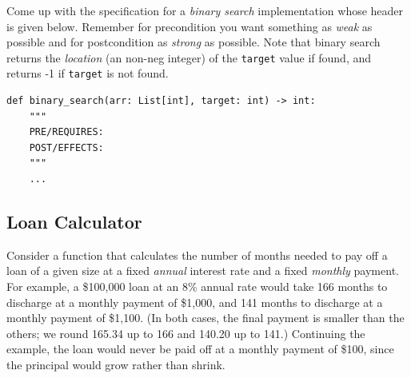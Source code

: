 \documentclass[oneside,11pt,dvipsnames]{book}
\newcommand{\code}[1]{\texttt{#1}}
\begin{document}
Come up with the specification for a \emph{binary search} implementation whose header is given below. Remember for precondition you want something as \emph{weak} as possible and for postcondition as \emph{strong} as possible. Note that binary search returns the \emph{location} (an non-neg integer) of the \code{target} value if found, and returns -1 if \code{target} is not found. 

\begin{lstlisting}
def binary_search(arr: List[int], target: int) -> int:
    """
    PRE/REQUIRES: 
    POST/EFFECTS: 
    """
    ... 
\end{lstlisting}


\subsection{Loan Calculator}\label{exercise:loan-calculator}    

Consider a function that calculates the number of months needed to pay off a loan of a given size at a fixed \emph{annual} interest rate and a fixed \emph{monthly} payment. For example, a \$100,000 loan at an 8\% annual rate would take 166 months to discharge at a monthly payment of \$1,000, and 141 months to discharge at a monthly payment of \$1,100. (In both cases, the final payment is smaller than the others; we round 165.34 up to 166 and 140.20 up to 141.) Continuing the example, the loan would never be paid off at a monthly payment of \$100, since the principal would grow rather than shrink.
\end{document}
